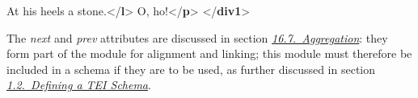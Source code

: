 \begin{shaded}
\hspace*{1em}\hspace*{1em}\hspace*{1em}At his heels a stone.{</\textbf{l}>}\mbox{}\newline 
\hspace*{1em}\hspace*{1em}\mbox{}\newline 
\hspace*{1em}\hspace*{1em}O, ho!{</\textbf{p}>}\mbox{}\newline 
\hspace*{1em}\mbox{}\newline 
{}\mbox{}\newline 
{</\textbf{div1}>}\end{shaded}\egroup\par \par
The {\itshape next} and {\itshape prev} attributes are discussed in section \textit{\hyperref[SAAG]{16.7.\ Aggregation}}: they form part of the module for alignment and linking; this module must therefore be included in a schema if they are to be used, as further discussed in section \textit{\hyperref[STIN]{1.2.\ Defining a TEI Schema}}.\par
